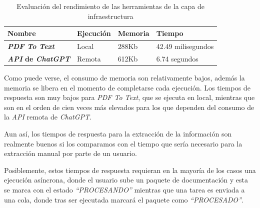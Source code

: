 \begin{table}[h]
    \renewcommand{\arraystretch}{1.5}
    \setlength{\tabcolsep}{10pt}
    \begin{tabular}{>{\bfseries}p{} p{} p{} p{}}
        \toprule
        \textbf{Nombre}                  & \textbf{Ejecución} & \textbf{Memoria} & \textbf{Tiempo}    \\
        \midrule
        \textit{PDF To Text}             & Local              & 288Kb            & 42.49 milisegundos \\
        \textit{API} de \textit{ChatGPT} & Remota             & 612Kb            & 6.74 segundos      \\
        \bottomrule
    \end{tabular}
    \caption{Evaluación del rendimiento de las herramientas de la capa de infraestructura}
    \label{tab:execution_performance}
\end{table}

Como puede verse, el consumo de memoria son relativamente bajos, además la memoria se libera en el momento de
completarse cada ejecución.
Los tiempos de respuesta son muy bajos para \textit{PDF To Text}, que se ejecuta en local, mientras que son en el
orden de cien veces más elevados para los que dependen del consumo de la \textit{API} remota de \textit{ChatGPT}.

Aun así, los tiempos de respuesta para la extracción de la información son realmente buenos si los comparamos con el
tiempo que sería necesario para la extracción manual por parte de un usuario.

Posiblemente, estos tiempos de respuesta requieran en la mayoría de los casos una ejecución asíncrona, donde el usuario
sube un paquete de documentación y esta se marca con el estado \textit{``PROCESANDO''} mientras que una tarea es
enviada a una cola, donde tras ser ejecutada marcará el paquete como \textit{``PROCESADO''}.
